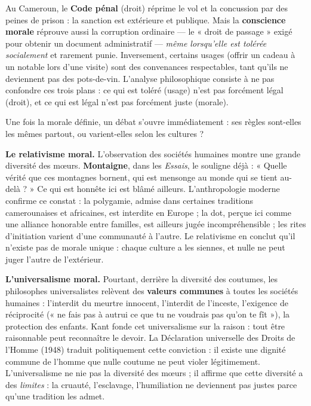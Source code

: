 \documentclass[11pt]{article}
\newcommand{\cle}[1]{{\popxbold\color{popdark}#1}}
\newcounter{popsec}
\newcounter{popsub}
\newcommand{\courssub}[1]{%
  \stepcounter{popsub}%
  \par\vspace{9pt}\noindent{\popxbold\fontsize{11.5}{13}\selectfont\color{popink}{\color{poporange}\thepopsec.\thepopsub}\hspace{6pt}#1}\par\nopagebreak\vspace{4pt}
}
\begin{document}
\begin{exemplebox}
Au Cameroun, le \textbf{Code pénal} (droit) réprime le vol et la concussion par des peines de prison : la sanction est extérieure et publique. Mais la \textbf{conscience morale} réprouve aussi la corruption ordinaire — le « droit de passage » exigé pour obtenir un document administratif — \emph{même lorsqu'elle est tolérée socialement} et rarement punie. Inversement, certains usages (offrir un cadeau à un notable lors d'une visite) sont des convenances respectables, tant qu'ils ne deviennent pas des pots-de-vin. L'analyse philosophique consiste à ne pas confondre ces trois plans : ce qui est toléré (usage) n'est pas forcément légal (droit), et ce qui est légal n'est pas forcément juste (morale).
\end{exemplebox}

\courssub{Relativisme et universalisme moral}

Une fois la morale définie, un débat s'ouvre immédiatement : ses règles sont-elles les mêmes partout, ou varient-elles selon les cultures ?

\textbf{Le relativisme moral.} L'observation des sociétés humaines montre une grande diversité des mœurs. \textbf{Montaigne}, dans les \emph{Essais}, le souligne déjà : « Quelle vérité que ces montagnes bornent, qui est mensonge au monde qui se tient au-delà ? » Ce qui est honnête ici est blâmé ailleurs. L'anthropologie moderne confirme ce constat : la polygamie, admise dans certaines traditions camerounaises et africaines, est interdite en Europe ; la dot, perçue ici comme une alliance honorable entre familles, est ailleurs jugée incompréhensible ; les rites d'initiation varient d'une communauté à l'autre. Le \cle{relativisme} en conclut qu'il n'existe pas de morale unique : chaque culture a les siennes, et nulle ne peut juger l'autre de l'extérieur.

\textbf{L'universalisme moral.} Pourtant, derrière la diversité des coutumes, les philosophes universalistes relèvent des \textbf{valeurs communes} à toutes les sociétés humaines : l'interdit du meurtre innocent, l'interdit de l'inceste, l'exigence de réciprocité (« ne fais pas à autrui ce que tu ne voudrais pas qu'on te fît »), la protection des enfants. Kant fonde cet universalisme sur la raison : tout être raisonnable peut reconnaître le devoir. La Déclaration universelle des Droits de l'Homme (1948) traduit politiquement cette conviction : il existe une dignité commune de l'homme que nulle coutume ne peut violer légitimement. L'universalisme ne nie pas la diversité des mœurs ; il affirme que cette diversité a des \emph{limites} : la cruauté, l'esclavage, l'humiliation ne deviennent pas justes parce qu'une tradition les admet.
\end{document}
